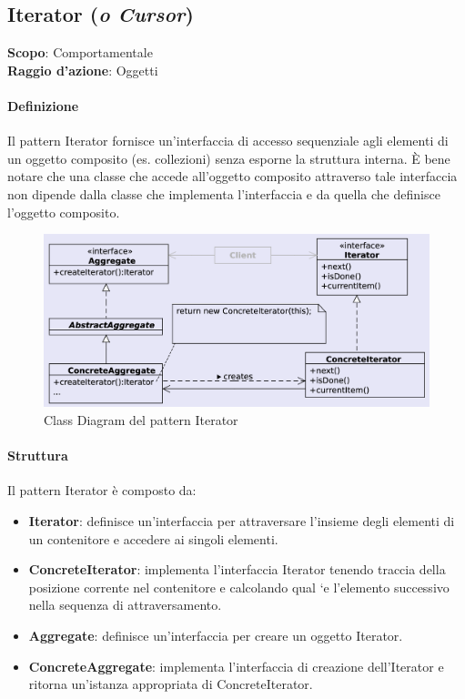 \subsection{Iterator (\textit{o Cursor})}
\label{iterator}

\textbf{Scopo}: Comportamentale \\
\textbf{Raggio d'azione}: Oggetti

\paragraph{Definizione} Il pattern Iterator fornisce un'interfaccia di accesso sequenziale agli elementi di un oggetto composito (es. collezioni) senza esporne la struttura interna. È bene notare che una classe che accede all’oggetto composito attraverso tale interfaccia non dipende dalla classe che implementa l’interfaccia e da quella che definisce l’oggetto composito.

\begin{figure}[H]
    \centering
    \includegraphics[width=1\linewidth]{assets/pattern/iterator/iterator-struttura.png}
    \caption{Class Diagram del pattern Iterator}
\end{figure}

\paragraph{Struttura} Il pattern Iterator è composto da:
\begin{itemize}
    \item \textbf{Iterator}: definisce un’interfaccia per attraversare l’insieme degli elementi di un contenitore e accedere ai singoli elementi.
    \item \textbf{ConcreteIterator}: implementa l’interfaccia Iterator tenendo traccia della posizione corrente nel contenitore e calcolando qual `e l’elemento successivo nella sequenza di attraversamento. 
    \item \textbf{Aggregate}: definisce un’interfaccia per creare un oggetto Iterator. 
    \item \textbf{ConcreteAggregate}: implementa l’interfaccia di creazione dell’Iterator e ritorna un’istanza appropriata di ConcreteIterator.
\end{itemize}

